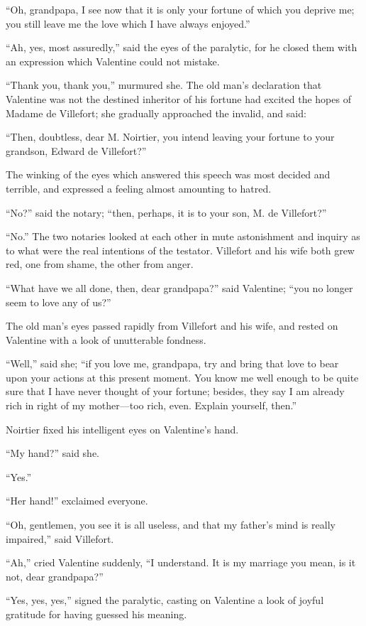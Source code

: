 “Oh, grandpapa, I see now that it is only your fortune of which you
deprive me; you still leave me the love which I have always enjoyed.”

“Ah, yes, most assuredly,” said the eyes of the paralytic, for he
closed them with an expression which Valentine could not mistake.

“Thank you, thank you,” murmured she. The old man’s declaration that
Valentine was not the destined inheritor of his fortune had excited the
hopes of Madame de Villefort; she gradually approached the invalid, and
said:

“Then, doubtless, dear M. Noirtier, you intend leaving your fortune to
your grandson, Edward de Villefort?”

The winking of the eyes which answered this speech was most decided and
terrible, and expressed a feeling almost amounting to hatred.

“No?” said the notary; “then, perhaps, it is to your son, M. de
Villefort?”

“No.” The two notaries looked at each other in mute astonishment and
inquiry as to what were the real intentions of the testator. Villefort
and his wife both grew red, one from shame, the other from anger.

“What have we all done, then, dear grandpapa?” said Valentine; “you no
longer seem to love any of us?”

The old man’s eyes passed rapidly from Villefort and his wife, and
rested on Valentine with a look of unutterable fondness.

“Well,” said she; “if you love me, grandpapa, try and bring that love
to bear upon your actions at this present moment. You know me well
enough to be quite sure that I have never thought of your fortune;
besides, they say I am already rich in right of my mother—too rich,
even. Explain yourself, then.”

Noirtier fixed his intelligent eyes on Valentine’s hand.

“My hand?” said she.

“Yes.”

“Her hand!” exclaimed everyone.

“Oh, gentlemen, you see it is all useless, and that my father’s mind is
really impaired,” said Villefort.

“Ah,” cried Valentine suddenly, “I understand. It is my marriage you
mean, is it not, dear grandpapa?”

“Yes, yes, yes,” signed the paralytic, casting on Valentine a look of
joyful gratitude for having guessed his meaning.

